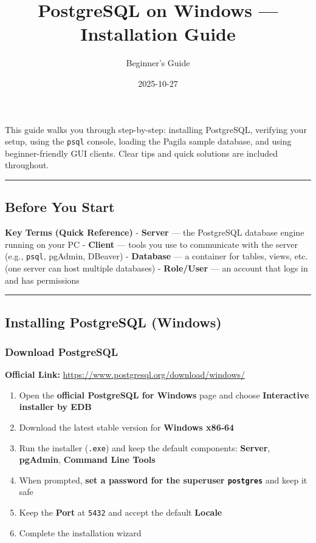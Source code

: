\documentclass[
  letterpaper,
  DIV=11,
  numbers=noendperiod]{scrartcl}
\title{PostgreSQL on Windows --- Installation Guide}
\author{Beginner's Guide}
\date{2025-10-27}
\providecommand{\tightlist}{%
  \setlength{\itemsep}{0pt}\setlength{\parskip}{0pt}}\usepackage{longtable,booktabs,array}
\begin{document}
\maketitle


This guide walks you through step-by-step: installing PostgreSQL,
verifying your setup, using the \texttt{psql} console, loading the
Pagila sample database, and using beginner-friendly GUI clients. Clear
tips and quick solutions are included throughout.

\begin{center}\rule{0.5\linewidth}{0.5pt}\end{center}

\subsection{Before You Start}\label{before-you-start}

\textbf{Key Terms (Quick Reference)} - \textbf{Server} --- the
PostgreSQL database engine running on your PC - \textbf{Client} ---
tools you use to communicate with the server (e.g., \texttt{psql},
pgAdmin, DBeaver) - \textbf{Database} --- a container for tables, views,
etc. (one server can host multiple databases) - \textbf{Role/User} ---
an account that logs in and has permissions

\begin{center}\rule{0.5\linewidth}{0.5pt}\end{center}

\subsection{Installing PostgreSQL
(Windows)}\label{installing-postgresql-windows}

\subsubsection{Download PostgreSQL}\label{download-postgresql}

\textbf{Official Link:}
\url{https://www.postgresql.org/download/windows/}

\begin{enumerate}
\def\labelenumi{\arabic{enumi}.}
\tightlist
\item
  Open the \textbf{official PostgreSQL for Windows} page and choose
  \textbf{Interactive installer by EDB}
\item
  Download the latest stable version for \textbf{Windows x86‑64}
\item
  Run the installer (\texttt{.exe}) and keep the default components:
  \textbf{Server}, \textbf{pgAdmin}, \textbf{Command Line Tools}
\item
  When prompted, \textbf{set a password for the superuser
  \texttt{postgres}} and keep it safe
\item
  Keep the \textbf{Port} at \texttt{5432} and accept the default
  \textbf{Locale}
\item
  Complete the installation wizard
\end{enumerate}
\end{document}
